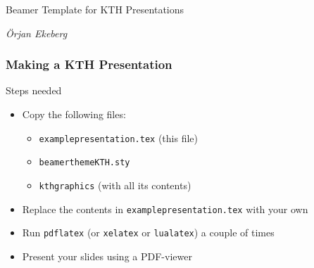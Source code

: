\documentclass[aspectratio=1610]{beamer}
\begin{document}
\begin{frame}

  \vspace{0.02\textheight}
  
  \begin{Large}
    Beamer Template for KTH Presentations
  \end{Large}

  \vspace{0.1\textheight}

  \begin{small}
    \textit{Örjan Ekeberg}
  \end{small}
\end{frame}




\begin{frame}
  \frametitle{Making a KTH Presentation}

  \begin{block}{Steps needed}
    \begin{itemize}
    \item Copy the following files:
    \begin{itemize}
    \item \texttt{examplepresentation.tex} (this file)
    \item \texttt{beamerthemeKTH.sty}
    \item \texttt{kthgraphics} (with all its contents)
    \end{itemize}
    \item Replace the contents in \texttt{examplepresentation.tex} with your own
    \item Run \texttt{pdflatex} (or \texttt{xelatex} or \texttt{lualatex}) a couple of times
    \item Present your slides using a PDF-viewer
    \end{itemize}
  \end{block}

\end{frame}
\end{document}
